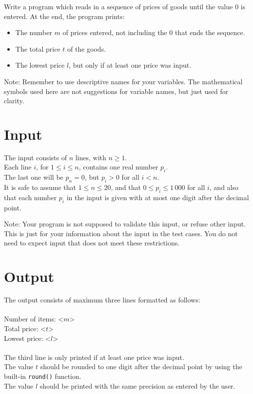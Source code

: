 
\noindent
Write a program which reads in a sequence of prices of goods until the value $0$ is entered.
At the end, the program prints:
\begin{itemize} 
    \item The number $m$ of prices entered, not including the $0$ that ends the sequence.
    \item The total price $t$ of the goods.
    \item The lowest price $l$, but only if at least one price was input.
\end{itemize}

Note: Remember to use descriptive names for your variables.
The mathematical symbols used here are not suggestions for variable names, but just used for clarity.

\section*{Input}
The input consists of $n$ lines, with $n \ge 1$. \\
Each line $i$, for $1 \le i \le n$, contains one real number $p_i$. \\
The last one will be $p_n = 0$, but $p_i > 0$ for all $i < n$. \\
It is safe to assume that $1 \le n \le 20$,
and that $0 \le p_i \le 1\,000$ for all $i$,
and also that each number $p_i$ in the input is given with at most one digit after the decimal point.

Note: Your program is not supposed to validate this input, or refuse other input.
This is just for your information about the input in the test cases.
You do not need to expect input that does not meet these restrictions.

\section*{Output}
The output consists of maximum three lines formatted as follows: \\ \\
\noindent
Number of items: <$m$> \\
\noindent
Total price: <$t$> \\
\noindent
Lowest price: <$l$> \\ \\
\noindent
The third line is only printed if at least one price was input. \\
\noindent
The value $t$ should be rounded to one digit after the decimal point by using the built-in \texttt{round()} function. \\
\noindent
The value $l$ should be printed with the same precision as entered by the user.
